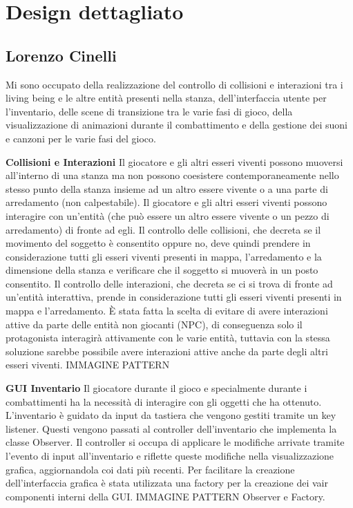 \documentclass[a4paper,12pt]{report}
\begin{document}
\section{Design dettagliato}

\subsection{Lorenzo Cinelli}
Mi sono occupato della realizzazione del controllo di collisioni e interazioni tra i living being e le altre entità presenti nella stanza, 
dell'interfaccia utente per l'inventario, delle scene di transizione tra le varie fasi di gioco, della visualizzazione di animazioni durante il combattimento
e della gestione dei suoni e canzoni per le varie fasi del gioco.

\textbf{Collisioni e Interazioni}
Il giocatore e gli altri esseri viventi possono muoversi all'interno di una stanza ma non possono coesistere 
contemporaneamente nello stesso punto della stanza insieme ad un altro essere vivente o a una parte di arredamento (non calpestabile).
Il giocatore e gli altri esseri viventi possono interagire con un'entità (che può essere un altro essere vivente o un pezzo di arredamento)
di fronte ad egli. 
Il controllo delle collisioni, che decreta se il movimento del soggetto è consentito oppure no, deve quindi prendere in considerazione
tutti gli esseri viventi presenti in mappa, l'arredamento e la dimensione della stanza e verificare che il soggetto si muoverà in un posto consentito.
Il controllo delle interazioni, che decreta se ci si trova di fronte ad un'entità interattiva, prende in considerazione
tutti gli esseri viventi presenti in mappa e l'arredamento. 
È stata fatta la scelta di evitare di avere interazioni attive da parte delle entità non giocanti (NPC), di conseguenza solo il protagonista interagirà
attivamente con le varie entità, tuttavia con la stessa soluzione sarebbe possibile avere interazioni attive anche da parte degli altri esseri viventi.
IMMAGINE
PATTERN

\textbf{GUI Inventario}
Il giocatore durante il gioco e specialmente durante i combattimenti ha la necessità di interagire con gli oggetti
che ha ottenuto. 
L'inventario è guidato da input da tastiera che vengono gestiti tramite un key listener. Questi vengono passati al
controller dell'inventario che implementa la classe Observer. Il controller si occupa di applicare le modifiche arrivate tramite
l'evento di input all'inventario e riflette queste modifiche nella visualizzazione grafica, aggiornandola coi dati più recenti.
Per facilitare la creazione dell'interfaccia grafica è stata utilizzata una factory per la creazione dei vair componenti
interni della GUI.
IMMAGINE
PATTERN Observer e Factory.
\end{document}
